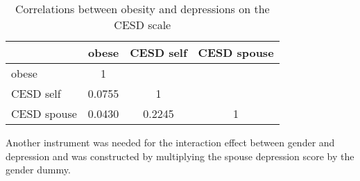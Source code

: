 \begin{table}[H]
\begin{center}
      \begin{tabular}{l | ccc}
                   & obese & CESD self  & CESD spouse \\ \hline
      obese &  1  & & \\
      CESD self & 0.0755  & 1 & \\
      CESD spouse &  0.0430 &  0.2245 & 1 \\
      \end{tabular}
            \caption{Correlations between obesity and depressions on the CESD scale}
      \label{tab:dep}
      \end{center}
\end{table}

Another instrument was needed for the interaction effect between gender and depression and was constructed by multiplying the spouse depression score by the gender dummy.
